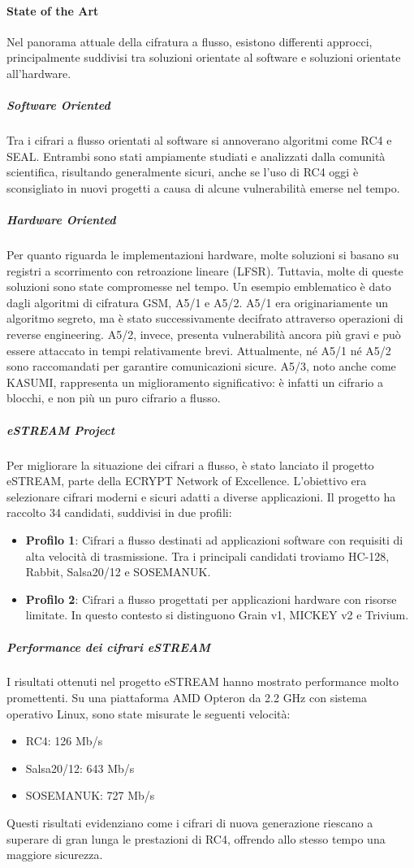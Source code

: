 \documentclass{report}
\begin{document}
\paragraph{State of the Art}
Nel panorama attuale della cifratura a flusso, esistono differenti approcci, principalmente suddivisi tra soluzioni orientate al software e soluzioni orientate all'hardware.

\subparagraph{Software Oriented}
Tra i cifrari a flusso orientati al software si annoverano algoritmi come RC4 e SEAL. Entrambi sono stati ampiamente studiati e analizzati dalla comunità scientifica, risultando generalmente sicuri, anche se l'uso di RC4 oggi è sconsigliato in nuovi progetti a causa di alcune vulnerabilità emerse nel tempo.

\subparagraph{Hardware Oriented}
Per quanto riguarda le implementazioni hardware, molte soluzioni si basano su registri a scorrimento con retroazione lineare (LFSR). Tuttavia, molte di queste soluzioni sono state compromesse nel tempo. Un esempio emblematico è dato dagli algoritmi di cifratura GSM, A5/1 e A5/2. A5/1 era originariamente un algoritmo segreto, ma è stato successivamente decifrato attraverso operazioni di reverse engineering. A5/2, invece, presenta vulnerabilità ancora più gravi e può essere attaccato in tempi relativamente brevi. Attualmente, né A5/1 né A5/2 sono raccomandati per garantire comunicazioni sicure. A5/3, noto anche come KASUMI, rappresenta un miglioramento significativo: è infatti un cifrario a blocchi, e non più un puro cifrario a flusso.

\subparagraph{eSTREAM Project}
Per migliorare la situazione dei cifrari a flusso, è stato lanciato il progetto eSTREAM, parte della ECRYPT Network of Excellence. L'obiettivo era selezionare cifrari moderni e sicuri adatti a diverse applicazioni. Il progetto ha raccolto 34 candidati, suddivisi in due profili:
\begin{itemize}
    \item \textbf{Profilo 1}: Cifrari a flusso destinati ad applicazioni software con requisiti di alta velocità di trasmissione. Tra i principali candidati troviamo HC-128, Rabbit, Salsa20/12 e SOSEMANUK.
    \item \textbf{Profilo 2}: Cifrari a flusso progettati per applicazioni hardware con risorse limitate. In questo contesto si distinguono Grain v1, MICKEY v2 e Trivium.
\end{itemize}

\subparagraph{Performance dei cifrari eSTREAM}
I risultati ottenuti nel progetto eSTREAM hanno mostrato performance molto promettenti. Su una piattaforma AMD Opteron da 2.2 GHz con sistema operativo Linux, sono state misurate le seguenti velocità:
\begin{itemize}
    \item RC4: 126 Mb/s
    \item Salsa20/12: 643 Mb/s
    \item SOSEMANUK: 727 Mb/s
\end{itemize}
Questi risultati evidenziano come i cifrari di nuova generazione riescano a superare di gran lunga le prestazioni di RC4, offrendo allo stesso tempo una maggiore sicurezza.
\end{document}
